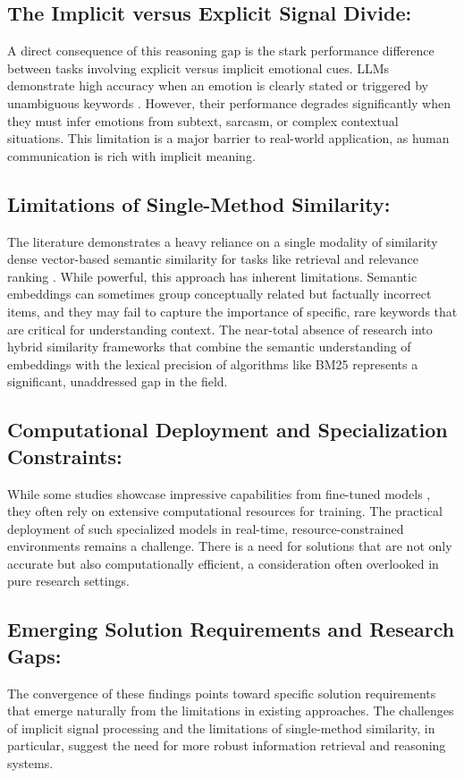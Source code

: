 \subsection{The Implicit versus Explicit Signal Divide:}
A direct consequence of this reasoning gap is the stark performance difference between tasks involving explicit versus implicit emotional cues. LLMs demonstrate high accuracy when an emotion is clearly stated or triggered by unambiguous keywords \cite{amin2023affective}. However, their performance degrades significantly when they must infer emotions from subtext, sarcasm, or complex contextual situations. This limitation is a major barrier to real-world application, as human communication is rich with implicit meaning.

\subsection{Limitations of Single-Method Similarity:}
The literature demonstrates a heavy reliance on a single modality of similarity dense vector-based semantic similarity for tasks like retrieval and relevance ranking \cite{xie2024empathy, shi2022does}. While powerful, this approach has inherent limitations. Semantic embeddings can sometimes group conceptually related but factually incorrect items, and they may fail to capture the importance of specific, rare keywords that are critical for understanding context. The near-total absence of research into hybrid similarity frameworks that combine the semantic understanding of embeddings with the lexical precision of algorithms like BM25 represents a significant, unaddressed gap in the field.

\subsection{Computational Deployment and Specialization Constraints:}
While some studies showcase impressive capabilities from fine-tuned models \cite{zhao2024moei}, they often rely on extensive computational resources for training. The practical deployment of such specialized models in real-time, resource-constrained environments remains a challenge. There is a need for solutions that are not only accurate but also computationally efficient, a consideration often overlooked in pure research settings.

\subsection{Emerging Solution Requirements and Research Gaps:}
The convergence of these findings points toward specific solution requirements that emerge naturally from the limitations in existing approaches. The challenges of implicit signal processing and the limitations of single-method similarity, in particular, suggest the need for more robust information retrieval and reasoning systems.

